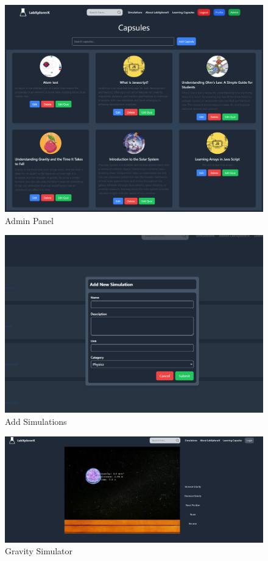  \begin{figure}[H]
    \centering
     \includegraphics[width = 16cm]{Diagrams/output/admin.png}
     \caption{Admin Panel}
 \end{figure}

 \begin{figure}[H]
    \centering
     \includegraphics[width = 16cm]{Diagrams/output/addsimulations.png}
     \caption{Add Simulations}
 \end{figure}

 \begin{figure}[H]
    \centering
     \includegraphics[width = 16cm]{Diagrams/output/gravity.png}
     \caption{Gravity Simulator}
 \end{figure}

